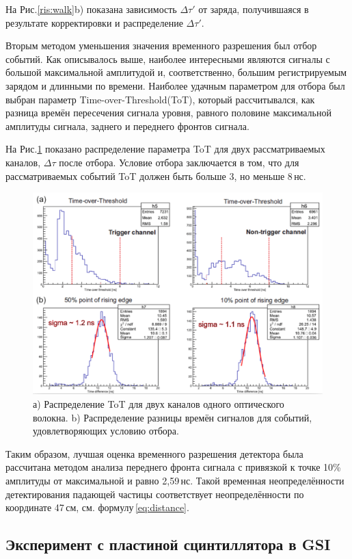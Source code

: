 На Рис.\ref{ris:walk}b) показана зависимость $\Delta\tau'$ от заряда, получившаяся в результате корректировки и распределение $\Delta\tau'$. 

Вторым методом уменьшения значения временного разрешения был отбор событий. Как описывалось выше, наиболее интересными являются сигналы с большой максимальной амплитудой и, соответственно, большим регистрируемым зарядом и длинными по времени. Наиболее удачным параметром для отбора был выбран параметр Time-over-Threshold(ToT), который рассчитывался, как разница времён пересечения сигнала уровня, равного половине максимальной амплитуды сигнала, заднего и переднего фронтов сигнала.

На Рис.\ref{ris:totcorr} показано распределение параметра ToT для двух рассматриваемых каналов, $\Delta\tau$ после отбора. Условие отбора заключается в том, что для рассматриваемых событий ToT должен быть больше 3, но меньше 8\,нс.

\begin{figure}[!h]
	\centering
	\includegraphics[width=0.8\linewidth]{totcorr.png}
	\caption{а) Распределение ToT для двух каналов одного оптического волокна. b) Распределение разницы времён сигналов для событий, удовлетворяющих условию отбора. }\label{ris:totcorr}
\end{figure}

Таким образом, лучшая оценка временного разрешения детектора была рассчитана методом анализа переднего фронта сигнала с привязкой к точке 10\% амплитуды от максимальной и равно 2,59\,нс. Такой временная неопределённости детектирования падающей частицы соответствует неопределённости по координате 47\,см, см. формулу\,\ref{eq:distance}. 

\subsection{Эксперимент с пластиной сцинтиллятора в GSI}

